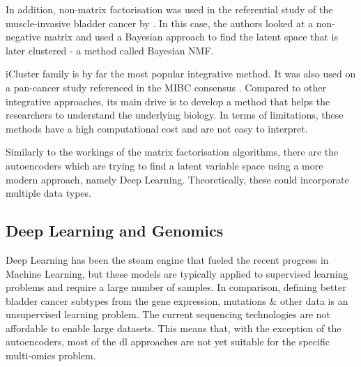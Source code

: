 In addition, non-matrix factorisation was used in the referential study of the muscle-invasive bladder cancer by \citet{Robertson2017-mg}. In this case, the authors looked at a non-negative matrix and used a Bayesian approach to find the latent space that is later clustered - a method called Bayesian NMF.

iCluster family is by far the most popular integrative method. It was also used on a pan-cancer \citep{Hoadley2018-qe} study referenced in the MIBC consensus \citep{Kamoun2020-tj}. Compared to other integrative approaches, its main drive is to develop a method that helps the researchers to understand the underlying biology. In terms of limitations, these methods have a high computational cost and are not easy to interpret.

Similarly to the workings of the matrix factorisation algorithms, there are the autoencoders which are trying to find a latent variable space using a more modern approach, namely Deep Learning. Theoretically, these could incorporate multiple data types.

\subsection{Deep Learning  and Genomics} \label{s:lit:dl_genomics}

\vspace{3mm}
\vspace{3mm}

Deep Learning has been the steam engine that fueled the recent progress in Machine Learning, but these models are typically applied to supervised learning problems and require a large number of samples. In comparison, defining better bladder cancer subtypes from the gene expression, mutations \& other data is an unsupervised learning problem. The current sequencing technologies are not affordable to enable large datasets. This means that, with the exception of the autoencoders, most of the \acrshort{dl} approaches are not yet suitable for the specific multi-omics problem.

